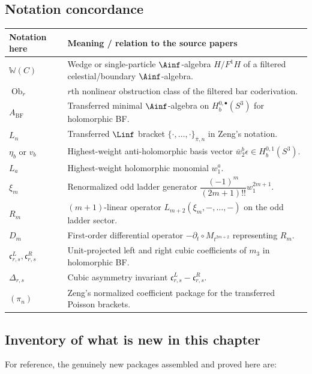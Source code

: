 \subsection{Notation concordance}

\begin{longtable}{>{\raggedright\arraybackslash}p{}>{\raggedright\arraybackslash}p{}}
\toprule
\textbf{Notation here} & \textbf{Meaning / relation to the source papers}\\
\midrule
$\mathbb{W}(C)$ & Wedge or single-particle $\Ainf$-algebra $H/F^1H$ of a filtered celestial/boundary $\Ainf$-algebra.\\
$\operatorname{Ob}_r$ & $r$th nonlinear obstruction class of the filtered bar coderivation.\\
$A_{\mathrm{BF}}$ & Transferred minimal $\Ainf$-algebra on $H_b^{0,\bullet}(S^3)$ for holomorphic BF.\\
$L_n$ & Transferred $\Linf$ bracket $\{\cdot,\dots,\cdot\}_{\bar\pi,n}$ in Zeng's notation.\\
$\eta_b$ or $v_b$ & Highest-weight anti-holomorphic basis vector $\bar w_2^b\epsilon \in H_b^{0,1}(S^3)$.\\
$L_a$ & Highest-weight holomorphic monomial $w_1^a$.\\
$\xi_m$ & Renormalized odd ladder generator $\dfrac{(-1)^m}{(2m+1)!!}w_1^{2m+1}$.\\
$R_m$ & $(m+1)$-linear operator $L_{m+2}(\xi_m,-,\dots,-)$ on the odd ladder sector.\\
$D_m$ & First-order differential operator $-\partial_t\circ M_{t^{2m+2}}$ representing $R_m$.\\
$\mathfrak c^L_{r,s},\mathfrak c^R_{r,s}$ & Unit-projected left and right cubic coefficients of $m_3$ in holomorphic BF.\\
$\Delta_{r,s}$ & Cubic asymmetry invariant $\mathfrak c^L_{r,s}-\mathfrak c^R_{r,s}$.\\
$(\pi_n)$ & Zeng's normalized coefficient package for the transferred Poisson brackets.\\
\bottomrule
\end{longtable}

\subsection{Inventory of what is new in this chapter}

For reference, the genuinely new packages assembled and proved here are:

